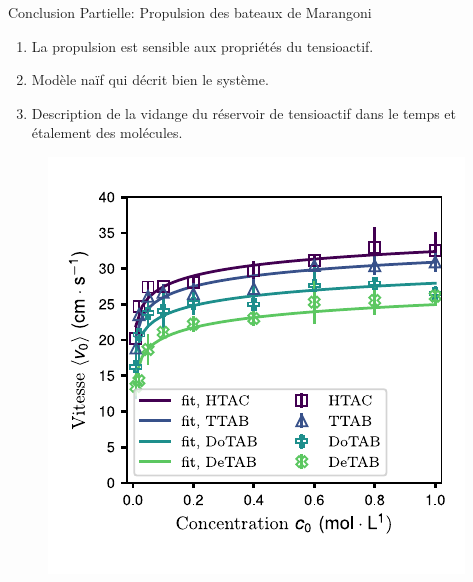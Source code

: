 \documentclass[aspectratio=169,10pt]{beamer}
\begin{document}
  
\begin{frame}{Conclusion Partielle: Propulsion des bateaux de Marangoni}
    \begin{enumerate}
    \item La propulsion est sensible aux propriétés du tensioactif.
    \item Modèle naïf qui décrit bien le système.
    \item Description de la vidange du réservoir de tensioactif dans le temps et étalement des molécules.
    \end{enumerate}
    \begin{figure}
      \includegraphics[width=.4\textwidth]{./figures/Bateau_v0_final.pdf}
  \end{figure}
\end{frame}
  
\end{document}

